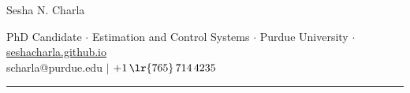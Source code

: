 \documentclass[letterpaper, 10pt]{article}
\begin{document}
\begin{center}
        \huge
        Sesha N. Charla
\end{center}
\begin{center}
        PhD Candidate $\cdot$
        Estimation and Control Systems $\cdot$
        Purdue University $\cdot$
        \href{https://seshacharla.github.io}{seshacharla.github.io}\\
        scharla@purdue.edu $|$
        $+1\,\lr{765}\, 714 \, 4235$
\end{center}

\noindent\rule{\textwidth}{0.4pt}


%




\end{document}

